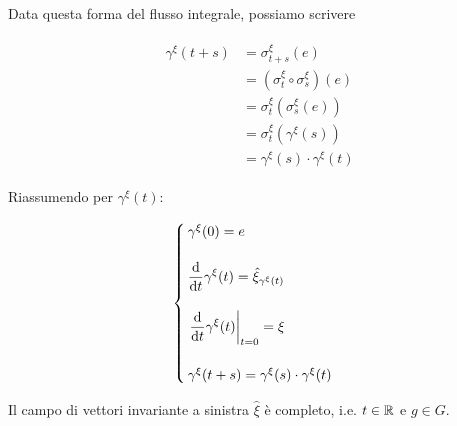 Data questa forma del flusso integrale, possiamo scrivere

\begin{align}
	\begin{split}
		\gamma^{\xi}(t+s) &= \sigma_{t+s}^{\xi}(e) \\
		&= (\sigma_{t}^{\xi} \circ \sigma_{s}^{\xi})(e) \\
		&= \sigma_{t}^{\xi}(\sigma_{s}^{\xi}(e)) \\
		&= \sigma_{t}^{\xi}(\gamma^{\xi}(s)) \\
		&= \gamma^{\xi}(s) \cdot \gamma^{\xi}(t)
	\end{split}
\end{align}

Riassumendo per $ \gamma^{\xi}(t) $:

\begin{equation}
	\begin{cases}
		\gamma^{\xi}(0) = e \\\\
		\ddv{t} \gamma^{\xi}(t) = \hat{\xi}_{\gamma^{\xi}(t)} \\\\
		\eval{ \ddv{t} \gamma^{\xi}(t) }_{t=0} = \xi \\\\
		\gamma^{\xi}(t+s) = \gamma^{\xi}(s) \cdot \gamma^{\xi}(t)
	\end{cases}
\end{equation}

\begin{definition}
	Il campo di vettori invariante a sinistra $ \hat{\xi} $ è completo, i.e. $ t \in \mathbb{R} $ e $ g \in G $.
\end{definition}

